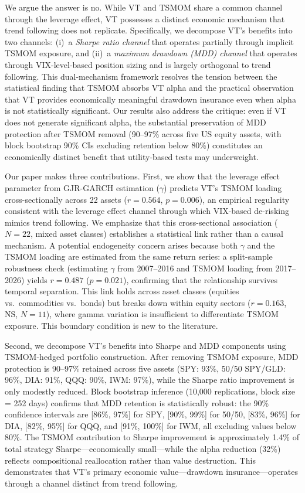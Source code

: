 We argue the answer is no. While VT and TSMOM share a common channel through the leverage effect, VT possesses a distinct economic mechanism that trend following does not replicate. Specifically, we decompose VT's benefits into two channels: (i)~a \textit{Sharpe ratio channel} that operates partially through implicit TSMOM exposure, and (ii)~a \textit{maximum drawdown (MDD) channel} that operates through VIX-level-based position sizing and is largely orthogonal to trend following. This dual-mechanism framework resolves the tension between the statistical finding that TSMOM absorbs VT alpha and the practical observation that VT provides economically meaningful drawdown insurance even when alpha is not statistically significant. Our results also address the \citet{cederburg2020} critique: even if VT does not generate significant alpha, the substantial preservation of MDD protection after TSMOM removal (90--97\% across five US equity assets, with block bootstrap 90\% CIs excluding retention below 80\%) constitutes an economically distinct benefit that utility-based tests may underweight.

Our paper makes three contributions. First, we show that the leverage effect parameter from GJR-GARCH estimation ($\gamma$) predicts VT's TSMOM loading cross-sectionally across 22 assets ($r = 0.564$, $p = 0.006$), an empirical regularity consistent with the leverage effect channel through which VIX-based de-risking mimics trend following. We emphasize that this cross-sectional association ($N = 22$, mixed asset classes) establishes a statistical link rather than a causal mechanism. A potential endogeneity concern arises because both $\gamma$ and the TSMOM loading are estimated from the same return series: a split-sample robustness check (estimating $\gamma$ from 2007--2016 and TSMOM loading from 2017--2026) yields $r = 0.487$ ($p = 0.021$), confirming that the relationship survives temporal separation. This link holds across asset classes (equities vs.\ commodities vs.\ bonds) but breaks down within equity sectors ($r = 0.163$, NS, $N = 11$), where gamma variation is insufficient to differentiate TSMOM exposure. This boundary condition is new to the literature.

Second, we decompose VT's benefits into Sharpe and MDD components using TSMOM-hedged portfolio construction. After removing TSMOM exposure, MDD protection is 90--97\% retained across five assets (SPY: 93\%, 50/50 SPY/GLD: 96\%, DIA: 91\%, QQQ: 90\%, IWM: 97\%), while the Sharpe ratio improvement is only modestly reduced. Block bootstrap inference (10,000 replications, block size = 252 days) confirms that MDD retention is statistically robust: the 90\% confidence intervals are [86\%, 97\%] for SPY, [90\%, 99\%] for 50/50, [83\%, 96\%] for DIA, [82\%, 95\%] for QQQ, and [91\%, 100\%] for IWM, all excluding values below 80\%. The TSMOM contribution to Sharpe improvement is approximately 1.4\% of total strategy Sharpe---economically small---while the alpha reduction (32\%) reflects compositional reallocation rather than value destruction. This demonstrates that VT's primary economic value---drawdown insurance---operates through a channel distinct from trend following.

